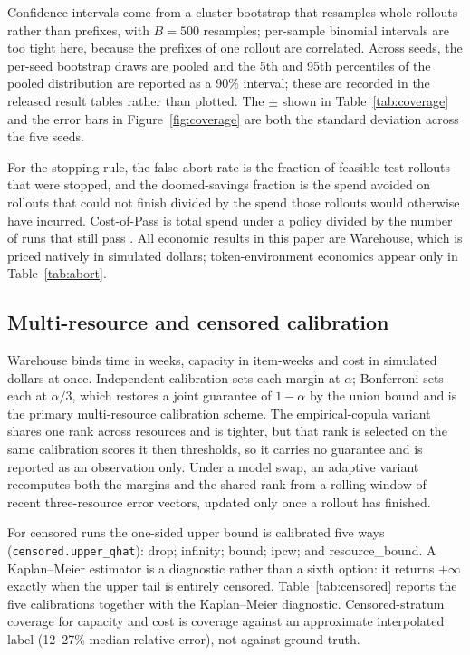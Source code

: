 \documentclass{article}
\begin{document}
Confidence intervals come from a cluster bootstrap that resamples whole rollouts rather
than prefixes, with $B = 500$ resamples; per-sample binomial intervals are too tight
here, because the prefixes of one rollout are correlated. Across seeds, the per-seed
bootstrap draws are pooled and the 5th and 95th percentiles of the pooled distribution
are reported as a 90\% interval; these are recorded in the released result tables
rather than plotted. The $\pm$ shown in Table~\ref{tab:coverage} and the error bars in
Figure~\ref{fig:coverage} are both the standard deviation across the five seeds.

For the stopping rule, the false-abort rate is the fraction of feasible test rollouts
that were stopped, and the doomed-savings fraction is the spend avoided on rollouts
that could not finish divided by the spend those rollouts would otherwise have
incurred. Cost-of-Pass is total spend under a policy divided by the number of runs that
still pass \cite{erol2026costofpass}. All economic results in this paper are Warehouse,
which is priced natively in simulated dollars; token-environment economics appear only
in Table~\ref{tab:abort}.



\subsection{Multi-resource and censored calibration}

Warehouse binds time in weeks, capacity in item-weeks and cost in simulated dollars at
once. Independent calibration sets each margin at $\alpha$; Bonferroni sets each at
$\alpha/3$, which restores a joint guarantee of $1{-}\alpha$ by the union bound and is
the primary multi-resource calibration scheme. The empirical-copula variant shares one
rank across resources and is tighter, but that rank is selected on the same calibration
scores it then thresholds, so it carries no guarantee and is reported as an observation
only. Under a model swap, an adaptive variant recomputes both the margins and the
shared rank from a rolling window of recent three-resource error vectors, updated only
once a rollout has finished.

For censored runs the one-sided upper bound is calibrated five ways
(\texttt{censored.upper\_qhat}): drop; infinity; bound; ipcw; and resource\_bound. A
Kaplan--Meier estimator \cite{kaplan1958nonparametric} is a diagnostic rather than a
sixth option: it returns $+\infty$ exactly when the upper tail is entirely censored.
Table~\ref{tab:censored} reports the five calibrations together with the Kaplan--Meier
diagnostic. Censored-stratum coverage for capacity and cost is coverage against an
approximate interpolated label (12--27\% median relative error), not against ground
truth.
\end{document}

